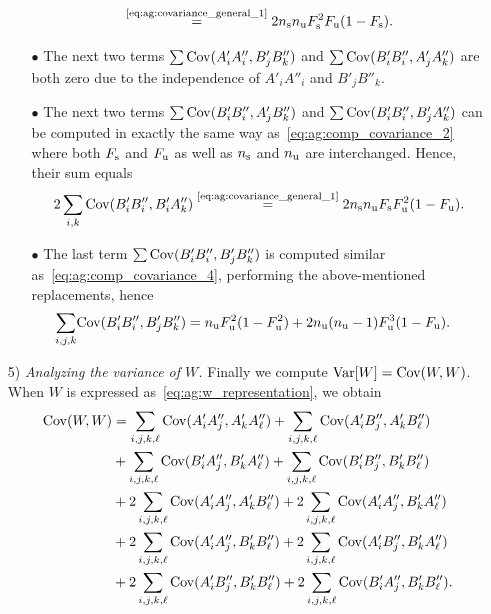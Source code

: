 \begin{itemize}
\begin{itemize}
\begin{equation}
            \stackrel{\text{\eqref{eq:ag:covariance_general_1}}}{=}
            2 n_\text{s} n_\text{u} F_\text{s}^2 F_\text{u} ( 1 - F_\text{s}). \label{eq:ag:comp_covariance_2}
        \end{equation}
      \item[$\bullet$]
        The next two terms $\sum {\mathrm{Cov}}( A'_i A''_i, B'_j B''_k )$
        and $\sum {\mathrm{Cov}}( B'_i B''_i, A'_j A''_k )$ are both zero
        due to the independence of $A'_i A''_i$ and $B'_j B''_k$.
      \item[$\bullet$]
        The next two terms $\sum {\mathrm{Cov}}( B'_i B''_i, A'_j B''_k )$
        and $\sum {\mathrm{Cov}}( B'_i B''_i, B'_j A''_k )$ can be computed in
        exactly the same way as~\eqref{eq:ag:comp_covariance_2} where
        both $F_\text{s}$ and $F_\text{u}$ as well as $n_\text{s}$ and $n_\text{u}$ are interchanged.
        Hence, their sum equals
        \begin{equation*}
          2 \sum_{i,k} {\mathrm{Cov}}( B'_i B''_i, B'_i A''_k )
            \stackrel{\text{\eqref{eq:ag:covariance_general_1}}}{=}
            2 n_\text{s}n_\text{u} F_\text{s} F_\text{u}^2 ( 1 - F_\text{u}).
        \end{equation*}
      \item[$\bullet$]
        The last term $\sum {\mathrm{Cov}}( B'_i B''_i, B'_j B''_k )$ is computed
        similar as~\eqref{eq:ag:comp_covariance_4},
        performing the above-mentioned replacements, hence
        \begin{align*}
          \sum_{i,j,k} &{\mathrm{Cov}}( B'_i B''_i, B'_j B''_k )
            = n_\text{u} F_\text{u}^2(1 - F_\text{u}^2) + 2n_\text{u}(n_\text{u}-1) F_\text{u}^3 (1 - F_\text{u}).
        \end{align*}
    \end{itemize}
  \item[5)] {\em Analyzing the variance of $W$.}
    Finally we compute ${\mathrm{Var}}[W] = {\mathrm{Cov}}(W, W)$. When $W$ is expressed
    as~\eqref{eq:ag:w_representation}, we obtain
    \begin{align*}
      \Cov(W, W)
      &= \sum_{i,j,k,\ell} \Cov(A'_i A''_j, A'_k A''_\ell) + \sum_{i,j,k,\ell} \Cov(A'_i B''_j, A'_k B''_\ell) \\
      &+\sum_{i,j,k,\ell} \Cov(B'_i A''_j, B'_k A''_\ell) + \sum_{i,j,k,\ell} \Cov(B'_i B''_j, B'_k B''_\ell) \\
      &+ 2 \sum_{i,j,k,\ell} \Cov(A'_i A''_j, A'_k B''_\ell) + 2 \sum_{i,j,k,\ell} \Cov(A'_i A''_j, B'_k A''_\ell) \\
      &+ 2 \sum_{i, j, k, \ell} \Cov(A'_i A''_j, B'_k B''_\ell) + 2 \sum_{i,j,k,\ell} \Cov(A'_i B''_j, B'_k A''_\ell) \\
      &+ 2 \sum_{i,j,k,\ell} \Cov(A'_i B''_j, B'_k B''_\ell) + 2 \sum_{i,j,k,\ell} \Cov( B'_i A''_j, B'_k B''_\ell).

\end{align*}
\end{itemize}
